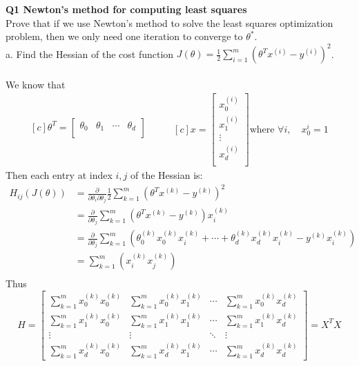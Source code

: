 \documentclass{article}
\begin{document}
{\large \bf Q1 Newton's method for computing least squares}\\
Prove that if we use Newton's method to solve the least squares optimization problem, 
then we only need one iteration to converge to \(\theta^*\).\\
a. Find the Hessian of the cost function \(J(\theta) = \frac{1}{2} \sum^{m}_{i=1}(\theta^{T}x^{(i)}-y^{(i)})^2\).\\
\\
We know that
\begin{equation*}
  \begin{aligned}[c]
    \theta^T = \begin{bmatrix}
        \theta_0  &\theta_1  & \cdots   & \theta_d \\
        \end{bmatrix} \\
  \end{aligned}
  \qquad
  \begin{aligned}[c]
    x = \begin{bmatrix}
     x_0^{(i)} \\
     x_1^{(i)} \\
     \vdots   \\
     x_d^{(i)} \\
    \end{bmatrix}
    \text{where }\forall i, \quad x_{0}^{i} = 1
  \end{aligned}
\end{equation*}
Then each entry at index \(i,j\) of the Hessian is:
\begin{align*}
    H_{ij}(J(\theta)) & = \frac{\partial }{\partial \theta_{i} \partial \theta_{j}}
    \frac{1}{2}\sum^{m}_{k=1}(\theta^{T}x^{(k)}-y^{(k)})^2\\
    & = \frac{\partial }{\partial \theta_{j}} \sum^{m}_{k=1}(\theta^{T}x^{(k)}-y^{(k)})x_{i}^{(k)}\\
    & = \frac{\partial }{\partial \theta_{j}} \sum^m_{k=1}(\theta_0^{(k)}x_{0}^{(k)}x_{i}^{(k)}
        + \cdots + \theta_d^{(k)}x_{d}^{(k)}x_{i}^{(k)}-y^{(k)}x_{i}^{(k)})\\
    & = \sum^{m}_{k=1}(x_{i}^{(k)}x_{j}^{(k)})\\
\end{align*}
Thus
\[
    H = \begin{bmatrix}
        \sum_{k=1}^{m}x_{0}^{(k)}x_{0}^{(k)} & \sum_{k=1}^{m}x_{0}^{(k)}x_{1}^{(k)} & \cdots & \sum_{k=1}^{m}x_{0}^{(k)}x_{d}^{(k)} \\
        \sum_{k=1}^{m}x_{1}^{(k)}x_{0}^{(k)} & \sum_{k=1}^{m}x_{1}^{(k)}x_{1}^{(k)} & \cdots & \sum_{k=1}^{m}x_{1}^{(k)}x_{d}^{(k)} \\
        \vdots & \vdots & \ddots & \vdots \\
        \sum_{k=1}^{m}x_{d}^{(k)}x_{0}^{(k)} & \sum_{k=1}^{m}x_{d}^{(k)}x_{1}^{(k)} & \cdots & \sum_{k=1}^{m}x_{d}^{(k)}x_{d}^{(k)}
    \end{bmatrix} = X^T X
\]
\end{document}
